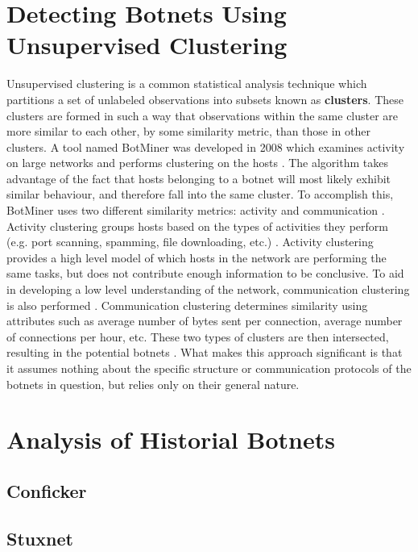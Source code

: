 \section{Detecting Botnets Using Unsupervised Clustering}
\label{detection}

Unsupervised clustering is a common statistical analysis technique which partitions a set of unlabeled
observations into subsets known as \textbf{clusters}.  These clusters are formed in
such a way that observations within the
same cluster are more similar to each other, by some similarity metric, than
those in other clusters. A tool named BotMiner was developed in 2008 which examines
activity on large networks and performs clustering on the hosts \cite{clustering}.
The algorithm takes advantage of the fact that hosts belonging to a botnet will most
likely exhibit similar behaviour, and therefore fall into the same cluster.
To accomplish this, BotMiner uses two different similarity metrics: activity and
communication \cite{clustering}.  Activity clustering groups hosts based on the
types of activities they perform (e.g. port scanning, spamming, file downloading,
etc.) \cite{clustering}.  Activity clustering provides a high level model of which
hosts in the network are performing the same tasks, but does not contribute enough
information to be conclusive.  To aid in developing a low level understanding
of the network, communication clustering is also performed \cite{clustering}.
Communication clustering determines similarity using attributes such as average
number of bytes sent per connection, average number of connections per hour, etc.
These two types of clusters are then intersected, resulting in the potential
botnets \cite{clustering}.  What makes this approach significant is that
it assumes nothing about the specific structure or communication protocols of
the botnets in question, but relies only on their general nature.

\section{Analysis of Historial Botnets}

\subsection{Conficker}

\subsection{Stuxnet}

